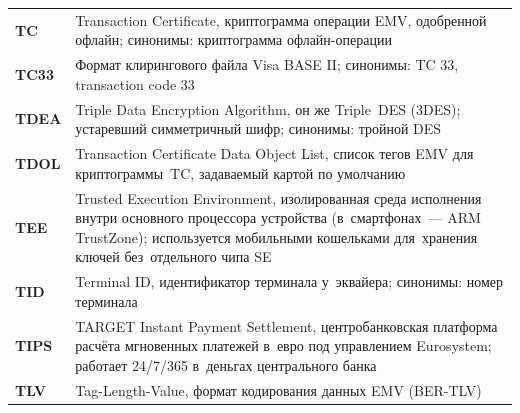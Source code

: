 \begin{longtable}{@{}p{4.5em}p{\dimexpr\linewidth-4.5em-2\tabcolsep\relax}@{}}
  \textbf{TC}                & Transaction Certificate, криптограмма операции EMV, одобренной офлайн; синонимы: криптограмма офлайн-операции                                                                                                                                                                                    \\
  \textbf{TC33}              & Формат клирингового файла Visa BASE II; синонимы: TC 33, transaction code 33                                                                                                                                                                                                                     \\
  \textbf{TDEA}              & Triple Data Encryption Algorithm, он же Triple~DES (3DES); устаревший симметричный шифр; синонимы: тройной DES                                                                                                                                                                                   \\
  \textbf{TDOL}              & Transaction Certificate Data Object List, список тегов EMV для криптограммы~TC, задаваемый картой по умолчанию                                                                                                                                                                                               \\
  \textbf{TEE}               & Trusted Execution Environment, изолированная среда исполнения внутри основного процессора устройства (в~смартфонах~--- ARM TrustZone); используется мобильными кошельками для~хранения ключей без~отдельного чипа SE                                                                                          \\
  \textbf{TID}               & Terminal ID, идентификатор терминала у~эквайера; синонимы: номер терминала                                                                                                                                                                                                                       \\
  \textbf{TIPS}              & TARGET Instant Payment Settlement, центробанковская платформа расчёта мгновенных платежей в~евро под управлением Eurosystem; работает 24/7/365 в~деньгах центрального банка                                                                                                                      \\
  \textbf{TLV}               & Tag-Length-Value, формат кодирования данных EMV (BER-TLV)                                                                                                                                                                                                                                        \\

\end{longtable}
